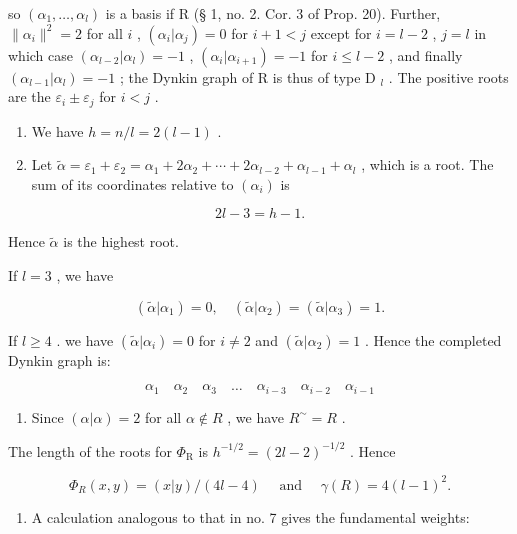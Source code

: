 so \((\alpha_{1},\ldots,\alpha_{l})\) is a basis if R (§ 1, no. 2. Cor. 3 of Prop. 20). Further, \(\| \alpha_{i}\|^{2}=2\) for all \(i\) , \((\alpha_{i}|\alpha_{j})=0\) for \(i+1<j\) except for \(i=l-2\) , \(j=l\) in which case \((\alpha_{l-2}|\alpha_{l})=-1\) , \((\alpha_{i}|\alpha_{i+1})=-1\) for \(i\leqslant l-2\) , and finally \((\alpha_{l-1}|\alpha_{l})=-1\) ; the Dynkin graph of R is thus of type D \(_{l}\) . The positive roots are the \(\varepsilon_{i}\pm\varepsilon_{j}\) for \(i<j\) .

\begin{enumerate}
\def\labelenumi{(\Roman{enumi})}
\setcounter{enumi}{2}
\item
  We have \(h = n / l = 2(l - 1)\) .
\item
  Let \(\tilde{\alpha} = \varepsilon_{1} + \varepsilon_{2} = \alpha_{1} + 2\alpha_{2} + \cdots + 2\alpha_{l-2} + \alpha_{l-1} + \alpha_{l}\) , which is a root. The sum of its coordinates relative to \((\alpha_{i})\) is
\end{enumerate}

\[
2 l - 3 = h - 1.
\]

Hence \(\tilde{\alpha}\) is the highest root.

If \(l = 3\) , we have

\[
(\tilde {\alpha} | \alpha_ {1}) = 0, \quad (\tilde {\alpha} | \alpha_ {2}) = (\tilde {\alpha} | \alpha_ {3}) = 1.
\]

If \(l \geqslant 4\) . we have \((\tilde{\alpha}|\alpha_i) = 0\) for \(i \neq 2\) and \((\tilde{\alpha}|\alpha_2) = 1\) . Hence the completed Dynkin graph is:

\[
\alpha_ {1} \quad \alpha_ {2} \quad \alpha_ {3} \quad \dots \quad \alpha_ {i - 3} \quad \alpha_ {i - 2} \quad \alpha_ {i - 1}
\]

\begin{enumerate}
\def\labelenumi{(\Alph{enumi})}
\setcounter{enumi}{21}
\tightlist
\item
  Since \((\alpha |\alpha) = 2\) for all \(\alpha \notin R\) , we have \(R^{\sim} = R\) .
\end{enumerate}

The length of the roots for \(\Phi_{\mathrm{R}}\) is \(h^{-1 / 2} = (2l - 2)^{-1 / 2}\) . Hence

\[
\Phi_ {R} (x, y) = (x | y) / (4 l - 4) \quad \text { and } \quad \gamma (R) = 4 (l - 1) ^ {2}.
\]

\begin{enumerate}
\def\labelenumi{(\Roman{enumi})}
\setcounter{enumi}{5}
\tightlist
\item
  A calculation analogous to that in no. 7 gives the fundamental weights:
\end{enumerate}

